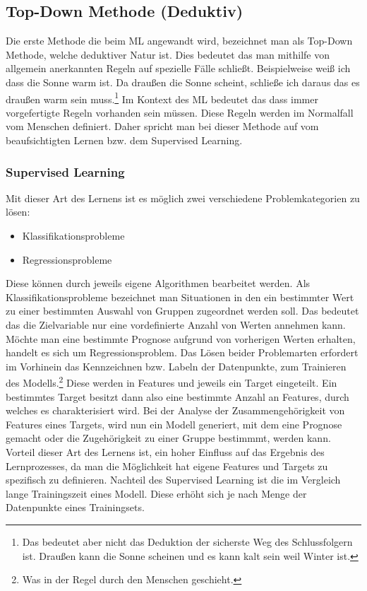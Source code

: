\documentclass[12pt,german,ngerman]{report}
\begin{document}
    \subsection{Top-Down Methode (Deduktiv)}
        Die erste Methode die beim ML angewandt wird, bezeichnet man als Top-Down Methode,
        welche deduktiver Natur ist. Dies bedeutet das man mithilfe von allgemein anerkannten Regeln
        auf spezielle Fälle schließt.\cite{dundi2021unileipzig} 
        Beispielweise weiß ich dass die Sonne warm ist. Da draußen die Sonne scheint, schließe ich daraus
        das es draußen warm sein muss.\footnote{Das bedeutet aber nicht das Deduktion der sicherste Weg des 
        Schlussfolgern ist. Draußen kann die Sonne scheinen und es kann kalt sein weil Winter ist.}
        Im Kontext des ML bedeutet das dass immer vorgefertigte Regeln vorhanden sein müssen.
        Diese Regeln werden im Normalfall vom Menschen definiert. Daher spricht man bei dieser Methode
        auf vom beaufsichtigten Lernen bzw. dem Supervised Learning.
        \subsubsection{Supervised Learning}
            Mit dieser Art des Lernens ist es möglich zwei verschiedene Problemkategorien zu lösen:\cite{supervisedlearning2021ibm}
            \begin{itemize}
                \item{Klassifikationsprobleme}
                \item{Regressionsprobleme}
            \end{itemize}
            Diese können durch jeweils eigene Algorithmen bearbeitet werden.
            Als Klassifikationsprobleme bezeichnet man Situationen in den ein bestimmter Wert zu einer
            bestimmten Auswahl von Gruppen zugeordnet werden soll. Das bedeutet das die Zielvariable
            nur eine vordefinierte Anzahl von Werten annehmen kann.\cite{kibuisness2021supervised}
            Möchte man eine bestimmte Prognose aufgrund von vorherigen Werten erhalten,
            handelt es sich um Regressionsproblem.\cite{kibuisness2021supervised}
            Das Lösen beider Problemarten erfordert im Vorhinein das Kennzeichnen bzw. Labeln der Datenpunkte, zum Trainieren des Modells.\footnote{Was in der Regel durch den Menschen geschieht.}
            Diese werden in Features und jeweils ein Target eingeteilt. Ein bestimmtes Target
            besitzt dann also eine bestimmte Anzahl an Features, durch welches es charakterisiert wird.
            Bei der Analyse der Zusammengehörigkeit von Features eines Targets, wird nun ein Modell
            generiert, mit dem eine Prognose gemacht oder die Zugehörigkeit zu einer Gruppe bestimmmt, werden kann.
            Vorteil dieser Art des Lernens ist, ein hoher Einfluss auf das Ergebnis des Lernprozesses,
            da man die Möglichkeit hat eigene Features und Targets zu spezifisch zu definieren.
            Nachteil des Supervised Learning ist die im Vergleich lange Trainingszeit eines Modell.
            Diese erhöht sich je nach Menge der Datenpunkte eines Trainingsets.
            
\end{document}
